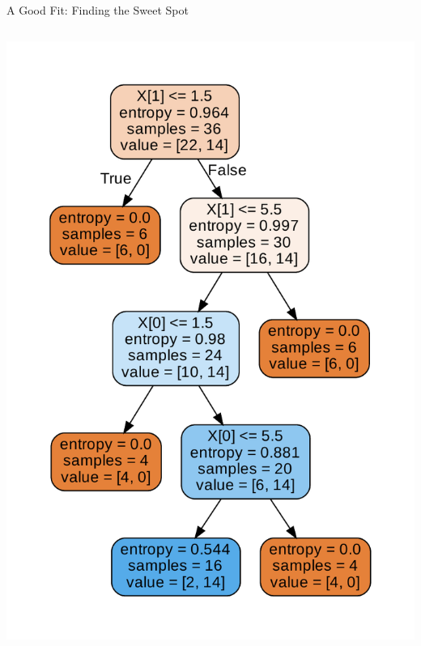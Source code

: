 \documentclass{beamer}
\begin{document}
\begin{frame}{A Good Fit: Finding the Sweet Spot}
\begin{columns}
\begin{column}{0.5\textwidth}
			\includegraphics[width =\textwidth]{example-2-optimal-tree}
		\end{column}
	\end{columns}

	\end{frame}
\end{document}
